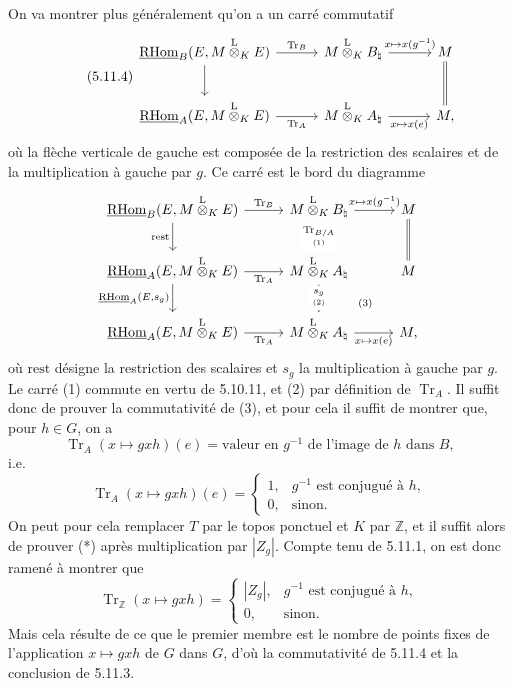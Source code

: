 \documentclass[11pt]{article}
\providecommand{\RHom}{\mathrm{RHom}}
\providecommand{\uRHom}{\underline{\RHom}}
\providecommand{\Tr}{\operatorname{Tr}}
\providecommand{\Tr}{\operatorname{Tr}}
\providecommand{\lten}{\overset{\mathrm L}{\otimes}}
\providecommand{\Tr}{\operatorname{Tr}}
\providecommand{\RHom}{\mathrm{RHom}}
\providecommand{\lten}{\overset{\mathrm L}{\otimes}}
\providecommand{\RHom}{\mathrm R\mathcal{H}om}
\providecommand{\lten}{\overset{\mathrm L}{\otimes}}
\providecommand{\Tr}{\operatorname{Tr}}
\providecommand{\lten}{\overset{\mathrm L}{\otimes}}
\providecommand{\lten}{\overset{\mathrm L}{\otimes}}
\providecommand{\lten}{\overset{\mathrm L}{\otimes}}
\providecommand{\RHom}{\mathrm{RHom}}
\providecommand{\Tr}{\operatorname{Tr}}
\providecommand{\lten}{\overset{\mathrm L}{\otimes}}
\begin{document}
On va montrer plus généralement qu'on a un carré commutatif
\begin{equation}\tag{5.11.4}
\begin{tikzcd}[column sep=3.0em,row sep=2.2em]
\uRHom_B(E,M\lten_KE) \arrow[r,"\Tr_B"] \arrow[d] &
M\lten_KB_\natural \arrow[r,"{x\mapsto x(g^{-1})}"] &
M \arrow[d,equal] \\
\uRHom_A(E,M\lten_KE) \arrow[r,"\Tr_A"'] &
M\lten_KA_\natural \arrow[r,"{x\mapsto x(e)}"'] &
M,
\end{tikzcd}
\end{equation}
où la flèche verticale de gauche est composée de la restriction des scalaires et de la multiplication à gauche par $g$. Ce carré est le bord du diagramme
\[
\begin{tikzcd}[column sep=2.8em,row sep=2.0em]
\uRHom_B(E,M\lten_KE) \arrow[r,"\Tr_B"] \arrow[d,"\mathrm{rest}"'] &
M\lten_KB_\natural \arrow[r,"{x\mapsto x(g^{-1})}"] \arrow[d,"{\underset{(1)}{\Tr_{B/A}}}" description] &
M \arrow[d,equal] \\
\uRHom_A(E,M\lten_KE) \arrow[r,"\Tr_A"'] \arrow[d,"{\uRHom_A(E,s_g)}"'] &
M\lten_KA_\natural \arrow[d,"{\underset{(2)}{s_g}}" description] \arrow[dr,phantom,"\scriptstyle(3)" description] &
M \\
\uRHom_A(E,M\lten_KE) \arrow[r,"\Tr_A"'] &
M\lten_KA_\natural \arrow[r,"{x\mapsto x(e)}"'] &
M,
\end{tikzcd}
\]
où $\mathrm{rest}$ désigne la restriction des scalaires et $s_g$ la multiplication à gauche par $g$. Le carré (1) commute en vertu de 5.10.11, et (2) par définition de $\Tr_A$. Il suffit donc de prouver la commutativité de (3), et pour cela il suffit de montrer que, pour $h\in G$, on a
\[
\Tr_A(x\mapsto gxh)(e)=\text{valeur en }g^{-1}\text{ de l'image de }h\text{ dans }B,
\]
i.e.
\begin{equation}\tag{*}
\Tr_A(x\mapsto gxh)(e)=
\begin{cases}
1,& g^{-1}\text{ est conjugué à }h,\\
0,& \text{sinon}.
\end{cases}
\end{equation}
On peut pour cela remplacer $T$ par le topos ponctuel et $K$ par $\mathbb Z$, et il suffit alors de prouver (*) après multiplication par $|Z_g|$. Compte tenu de 5.11.1, on est donc ramené à montrer que
\[
\Tr_{\mathbb Z}(x\mapsto gxh)=
\begin{cases}
|Z_g|,& g^{-1}\text{ est conjugué à }h,\\
0,& \text{sinon}.
\end{cases}
\]
Mais cela résulte de ce que le premier membre est le nombre de points fixes de l'application $x\mapsto gxh$ de $G$ dans $G$, d'où la commutativité de 5.11.4 et la conclusion de 5.11.3.
\end{document}
